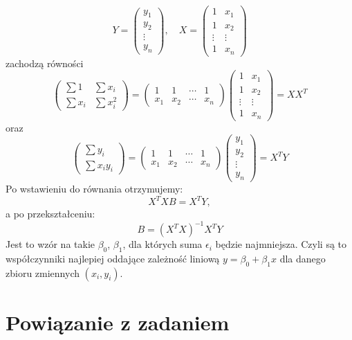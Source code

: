 \documentclass[a4paper,12pt]{article}
\begin{document}
$$
Y = \begin{pmatrix} y_1 \\ y_2 \\ \vdots \\ y_n \end{pmatrix}, \quad
X = \begin{pmatrix} 1 & x_1 \\ 1 & x_2 \\ \vdots & \vdots \\ 1 & x_n \end{pmatrix}
$$
zachodzą równości
$$
\begin{pmatrix} \sum 1 & \sum x_i \\
\sum x_i & \sum x_i^2 \end{pmatrix}  =
\begin{pmatrix} 1 & 1 & \cdots & 1 \\
x_1 & x_2 & \cdots & x_n \end{pmatrix}
\begin{pmatrix} 1 & x_1 \\ 1 & x_2 \\ \vdots & \vdots \\ 1 & x_n \end{pmatrix}
=
XX^{T}
$$
oraz
$$
\begin{pmatrix} \sum y_i \\ \sum x_iy_i \end{pmatrix}
=
\begin{pmatrix} 1 & 1 & \cdots & 1 \\
x_1 & x_2 & \cdots & x_n \end{pmatrix}
\begin{pmatrix} y_1 \\ y_2 \\ \vdots \\ y_n \end{pmatrix}
=
X^{T}Y
$$
Po wstawieniu do równania otrzymujemy:
$$ X^{T}XB = X^{T}Y, $$
a po przekształceniu:
\begin{equation} B = (X^{T}X)^{-1}X^{T}Y  \end{equation}
Jest to wzór na takie $\beta_0$, $\beta_1$, dla których suma $\epsilon_i$ będzie najmniejsza. Czyli są to współczynniki najlepiej oddające zależność liniową $ y = \beta_0 + \beta_1x$ dla danego zbioru zmiennych $(x_i, y_i)$.


\section{Powiązanie z zadaniem}
\end{document}
